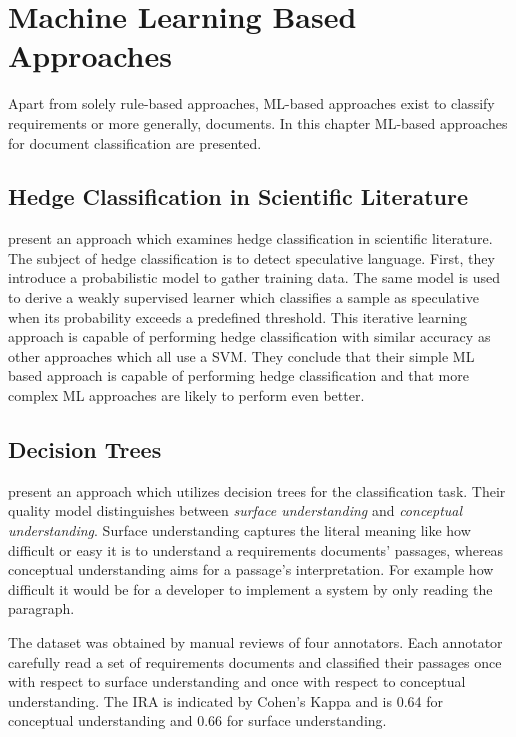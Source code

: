 \section{Machine Learning Based Approaches}
\label{chp:related_research:sec:machine_learingn_based_approaches}

Apart from solely rule-based approaches, \ac{ML}-based approaches exist to classify requirements or more generally, documents.
In this chapter \ac{ML}-based approaches for document classification are presented.

\subsection{Hedge Classification in Scientific Literature}
\textcite{Medlock:2007} present an approach which examines hedge classification in scientific literature.
The subject of hedge classification is to detect speculative language.
First, they introduce a probabilistic model to gather training data.
The same model is used to derive a weakly supervised learner which classifies a sample as speculative when its probability exceeds a predefined threshold.
This iterative learning approach is capable of performing hedge classification with similar accuracy as other approaches which all use a \ac{SVM}.
They conclude that their simple \ac{ML} based approach is capable of performing hedge classification and that more complex \ac{ML} approaches are likely to perform even better.

\subsection{Decision Trees}
\textcite{Ormandjieva:2007} present an approach which utilizes decision trees for the classification task.
Their quality model distinguishes between \textit{surface understanding} and \textit{conceptual understanding}.
Surface understanding captures the literal meaning like how difficult or easy it is to understand a requirements documents' passages, whereas conceptual understanding aims for a passage's interpretation.
For example how difficult it would be for a developer to implement a system by only reading the paragraph.

The dataset was obtained by manual reviews of four annotators.
Each annotator carefully read a set of requirements documents and classified their passages once with respect to surface understanding and once with respect to conceptual understanding.
The \ac{IRA} is indicated by Cohen's Kappa \parencite{Cohen:1960} and is 0.64 for conceptual understanding and 0.66 for surface understanding.

